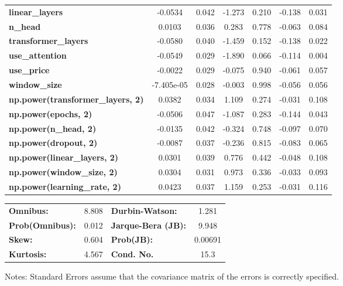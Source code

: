 \begin{center}
\begin{tabular}{lcccccc}
\textbf{linear\_layers}                   &      -0.0534  &        0.042     &    -1.273  &         0.210        &       -0.138    &        0.031     \\
\textbf{n\_head}                          &       0.0103  &        0.036     &     0.283  &         0.778        &       -0.063    &        0.084     \\
\textbf{transformer\_layers}              &      -0.0580  &        0.040     &    -1.459  &         0.152        &       -0.138    &        0.022     \\
\textbf{use\_attention}                   &      -0.0549  &        0.029     &    -1.890  &         0.066        &       -0.114    &        0.004     \\
\textbf{use\_price}                       &      -0.0022  &        0.029     &    -0.075  &         0.940        &       -0.061    &        0.057     \\
\textbf{window\_size}                     &   -7.405e-05  &        0.028     &    -0.003  &         0.998        &       -0.056    &        0.056     \\
\textbf{np.power(transformer\_layers, 2)} &       0.0382  &        0.034     &     1.109  &         0.274        &       -0.031    &        0.108     \\
\textbf{np.power(epochs, 2)}              &      -0.0506  &        0.047     &    -1.087  &         0.283        &       -0.144    &        0.043     \\
\textbf{np.power(n\_head, 2)}             &      -0.0135  &        0.042     &    -0.324  &         0.748        &       -0.097    &        0.070     \\
\textbf{np.power(dropout, 2)}             &      -0.0087  &        0.037     &    -0.236  &         0.815        &       -0.083    &        0.065     \\
\textbf{np.power(linear\_layers, 2)}      &       0.0301  &        0.039     &     0.776  &         0.442        &       -0.048    &        0.108     \\
\textbf{np.power(window\_size, 2)}        &       0.0304  &        0.031     &     0.973  &         0.336        &       -0.033    &        0.093     \\
\textbf{np.power(learning\_rate, 2)}      &       0.0423  &        0.037     &     1.159  &         0.253        &       -0.031    &        0.116     \\
\bottomrule
\end{tabular}
\begin{tabular}{lclc}
\textbf{Omnibus:}       &  8.808 & \textbf{  Durbin-Watson:     } &    1.281  \\
\textbf{Prob(Omnibus):} &  0.012 & \textbf{  Jarque-Bera (JB):  } &    9.948  \\
\textbf{Skew:}          &  0.604 & \textbf{  Prob(JB):          } &  0.00691  \\
\textbf{Kurtosis:}      &  4.567 & \textbf{  Cond. No.          } &     15.3  \\
\bottomrule
\end{tabular}
\end{center}

Notes: \newline
 [1] Standard Errors assume that the covariance matrix of the errors is correctly specified.